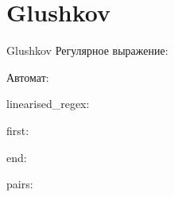 \section{Glushkov}
\begin{frame}{Glushkov}
	Регулярное выражение:


	Автомат:


	linearised_regex:


	first:


	end:


	pairs:


\end{frame}




